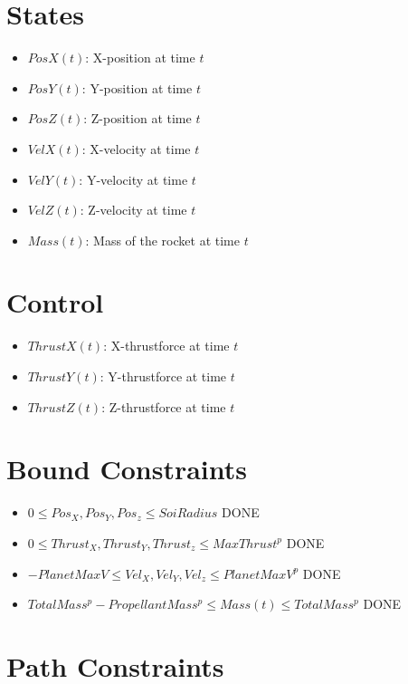 \documentclass[11pt]{report}
\newcommand{\DONE}{{DONE}}
\begin{document}
\section{States}

\begin{itemize}
\item $PosX(t)$: X-position at time $t$
\item $PosY(t)$: Y-position at time $t$
\item $PosZ(t)$: Z-position at time $t$

\item $VelX(t)$: X-velocity at time $t$
\item $VelY(t)$: Y-velocity at time $t$
\item $VelZ(t)$: Z-velocity at time $t$

\item $Mass(t)$: Mass of the rocket at time $t$
\end{itemize}

\section{Control}

\begin{itemize}
\item $ThrustX(t)$: X-thrustforce at time $t$
\item $ThrustY(t)$: Y-thrustforce at time $t$
\item $ThrustZ(t)$: Z-thrustforce at time $t$
\end{itemize}

\section{Bound Constraints}

\begin{itemize}
\item $0\leq Pos_X, Pos_Y, Pos_z \leq SoiRadius$ \DONE
\item $0\leq Thrust_X, Thrust_Y, Thrust_z \leq MaxThrust^p$ \DONE
\item $-PlanetMaxV\leq Vel_X, Vel_Y, Vel_z \leq PlanetMaxV^p$ \DONE
\item $TotalMass^p - PropellantMass^p \leq Mass(t) \leq TotalMass^p$ \DONE
\end{itemize}

\section{Path Constraints}
\end{document}
